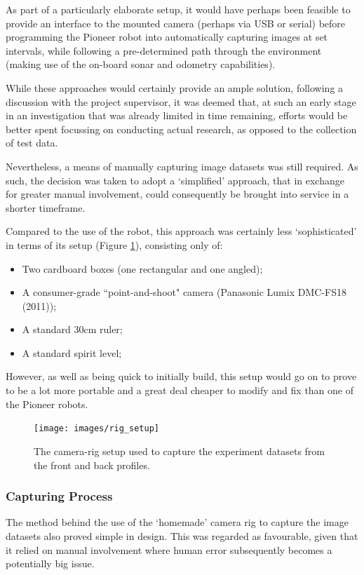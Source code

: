 As part of a particularly elaborate setup, it would have perhaps been feasible to provide an interface to the mounted camera (perhaps via USB or serial) before programming the Pioneer robot into automatically capturing images at set intervals, while following a pre-determined path through the environment (making use of the on-board sonar and odometry capabilities). 

While these approaches would certainly provide an ample solution, following a discussion with the project supervisor, it was deemed that, at such an early stage in an investigation that was already limited in time remaining, efforts would be better spent focussing on conducting actual research, as opposed to the collection of test data.

Nevertheless, a means of manually capturing image datasets was still required. As such, the decision was taken to adopt a `simplified' approach, that in exchange for greater manual involvement, could consequently be brought into service in a shorter timeframe.

Compared to the use of the robot, this approach was certainly less `sophisticated' in terms of its setup (Figure \ref{fig:rig}), consisting only of:

\begin{itemize}
	\item Two cardboard boxes (one rectangular and one angled);
	\item A consumer-grade ``point-and-shoot" camera (Panasonic Lumix DMC-FS18 (2011));
	\item A standard 30cm ruler;
	\item A standard spirit level;
\end{itemize}

However, as well as being quick to initially build, this setup would go on to prove to be a lot more portable and a great deal cheaper to modify and fix than one of the Pioneer robots. 

\begin{figure}[ht!]
\centering
\texttt{[image: images/rig\_setup]}
  \caption{The camera-rig setup used to capture the experiment datasets from the front and back profiles.}
\label{fig:rig}
\end{figure} 


\subsubsection{Capturing Process}

The method behind the use of the `homemade' camera rig to capture the image datasets also proved simple in design. This was regarded as favourable, given that it relied on manual involvement where human error subsequently becomes a potentially big issue. 

